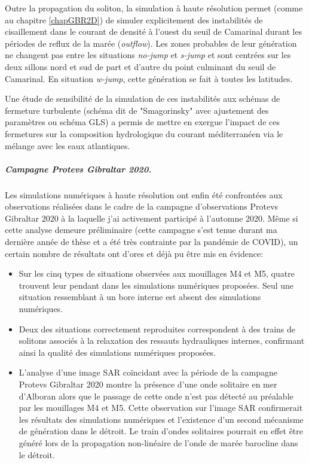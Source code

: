 Outre la propagation du soliton, la simulation à haute résolution permet (comme au chapitre \ref{chapGBR2D}) de simuler explicitement des instabilités de cisaillement dans le courant de densité à l'ouest du seuil de Camarinal durant les périodes de reflux de la marée (\textit{outflow}). Les zones probables de leur génération ne changent pas entre les situations \textit{no-jump} et \textit{s-jump} et sont centrées sur les deux sillons nord et sud de part et d'autre du point culminant du seuil de Camarinal. En situation \textit{w-jump}, cette génération se fait à toutes les latitudes.

Une étude de sensibilité de la simulation de ces instabilités aux schémas de fermeture turbulente (schéma dit de "Smagorinsky" avec ajustement des paramètres ou schéma GLS) a permis de mettre en exergue l'impact de ces fermetures sur la composition hydrologique du courant méditerranéen via le mélange avec les eaux atlantiques.

\subparagraph{Campagne Protevs Gibraltar 2020.}
Les simulations numériques à haute résolution ont enfin été confrontées aux observations réalisées dans le cadre de la campagne d'observations Protevs Gibraltar 2020 à la laquelle j'ai activement participé à l'automne 2020. Même si cette analyse demeure préliminaire (cette campagne s'est tenue durant ma dernière année de thèse et a été très contrainte par la pandémie de COVID), un certain nombre de résultats ont d'ores et déjà pu être mis en évidence:
\begin{itemize}
    \item Sur les cinq types de situations observées aux mouillages M4 et M5, quatre trouvent leur pendant dans les simulations numériques proposées. Seul une situation ressemblant à un bore interne est absent des simulations numériques.
    \item Deux des situations correctement reproduites correspondent à des trains de solitons associés à la relaxation des ressauts hydrauliques internes, confirmant ainsi la qualité des simulations numériques proposées.
    \item L'analyse d'une image SAR coïncidant avec la période de la campagne Protevs Gibraltar 2020 montre la présence d'une onde solitaire en mer d'Alboran alors que le passage de cette onde n'est pas détecté au préalable par les mouillages M4 et M5. Cette observation sur l'image SAR confirmerait les résultats des simulations numériques et l'existence d'un second mécanisme de génération dans le détroit. Le train d'ondes solitaires pourrait en effet être généré lors de la propagation non-linéaire de l'onde de marée barocline dans le détroit.
\end{itemize}

